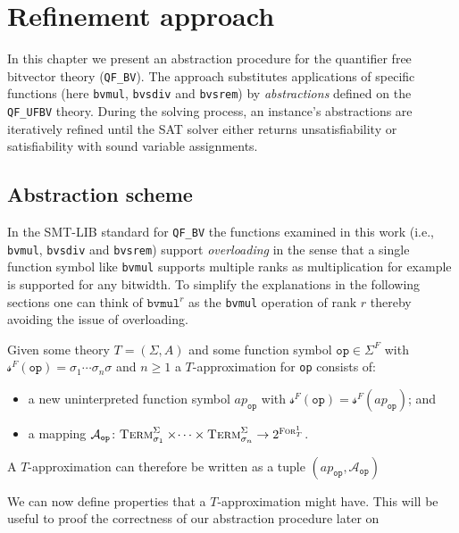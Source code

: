 \chapter{Refinement approach}
\label{ch:refinement}
In this chapter we present an abstraction procedure for the quantifier free bitvector theory (\texttt{QF\_BV}).
The approach substitutes applications of specific functions (here \texttt{bvmul}, \texttt{bvsdiv} and \texttt{bvsrem}) by \textit{abstractions} defined on the \texttt{QF\_UFBV} theory.
During the solving process, an instance's abstractions are iteratively refined until the SAT solver either returns unsatisfiability or satisfiability with sound variable assignments.

\section{Abstraction scheme}
In the SMT-LIB standard \cite{BarFT-SMTLIB} for \texttt{QF\_BV} the functions examined in this work (i.e., \texttt{bvmul}, \texttt{bvsdiv} and \texttt{bvsrem}) support \textit{overloading} in the sense that a single function symbol like \texttt{bvmul} supports multiple ranks as multiplication for example is supported for any bitwidth.
To simplify the explanations in the following sections one can think of $\texttt{bvmul}^r$ as the \texttt{bvmul} operation of rank $r$ thereby avoiding the issue of overloading.

\begin{definition}[Approximation]
Given some theory $T=\left(\Sigma,A\right)$ and some function symbol $\texttt{op}\in\Sigma^F$ with $\mathcal{s}^F\left(\texttt{op}\right)=\sigma_1\dotsi\sigma_n\sigma$ and $n\geq1$ a $T$-approximation for \texttt{op} consists of:
\begin{itemize}
    \item a new uninterpreted function symbol $ap_{\texttt{op}}$ with $\mathcal{s}^F\left(\texttt{op}\right) = \mathcal{s}^F\left(ap_{\texttt{op}}\right)$; and
    \item a mapping $\mathcal{A}_{\texttt{op}}\colon \textsc{Term}^\Sigma_{\sigma_1}\times\dotsi\times\textsc{Term}^\Sigma_{\sigma_n} \to 2^{\textsc{For}^1_T}$.
\end{itemize}
A $T$-approximation can therefore be written as a tuple $\left(ap_{\texttt{op}}, \mathcal{A}_{\texttt{op}}\right)$
\end{definition}
We can now define properties that a $T$-approximation might have. This will be useful to proof the correctness of our abstraction procedure later on

